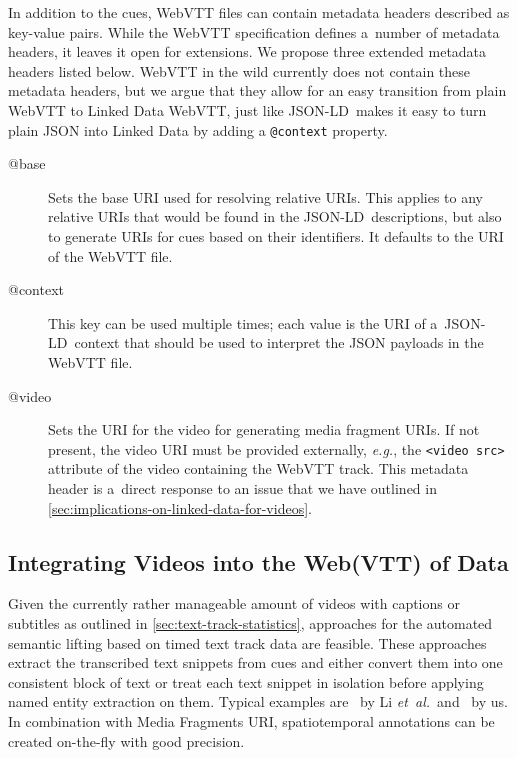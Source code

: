 \documentclass{sig-alternate}
\def\JSONLD{\mbox{JSON-LD}}
\begin{document}
In addition to the cues, WebVTT files can contain
metadata headers described as key-value pairs.
While the WebVTT specification defines a~number of metadata headers,
it leaves it open for extensions.
We propose three extended metadata headers listed below.
WebVTT in the wild currently does not contain
these metadata headers,
but we argue that they allow for an easy transition
from plain WebVTT to Linked Data WebVTT,
just like \JSONLD\ makes it easy to turn plain JSON into Linked Data
by adding a \texttt{@context} property.

\begin{description}
  \item[@base]
  Sets the base URI used for resolving relative URIs.
  This applies to any relative URIs that would be found in the \JSONLD\ descriptions,
  but also to generate URIs for cues based on their identifiers.
  It defaults to the URI of the WebVTT file.
  \item[@context]
  This key can be used multiple times; each value is the URI
  of a~\JSONLD\ context that should be used to
  interpret the JSON payloads in the WebVTT file.
  \item[@video]
  Sets the URI for the video for generating media fragment URIs.
  If not present, the video URI must be provided externally,
  \emph{e.g.}, the \texttt{<video src>} attribute of the video
  containing the WebVTT track.
  This metadata header is a~direct response to an issue that we
  have outlined in \autoref{sec:implications-on-linked-data-for-videos}.
\end{description}

\subsection{Integrating Videos into the Web(VTT) of Data}

Given the currently rather manageable amount of videos
with captions or subtitles as outlined in \autoref{sec:text-track-statistics},
approaches for the automated semantic lifting
based on timed text track data are feasible. 
These approaches extract the transcribed text snippets from cues
and either convert them into one consistent block of text
or treat each text snippet in isolation
before applying named entity extraction on them.
Typical examples are~\cite{li2013enriching,li2012creating,yi2012synote}
by Li \emph{et~al.}\ and~\cite{steiner2010semwebvid} by us.
In combination with Media Fragments URI, spatiotemporal annotations
can be created on-the-fly with good precision.
\end{document}
